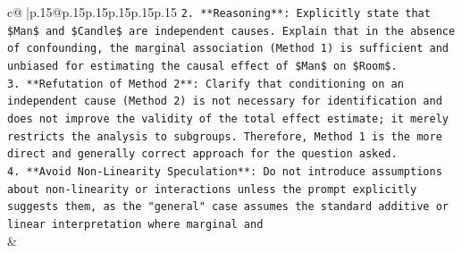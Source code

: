 \documentclass{article}
\begin{document}
{\begin{supertabular}{c@{$\;$}|p{.15\linewidth}@{}p{.15\linewidth}p{.15\linewidth}p{.15\linewidth}p{.15\linewidth}p{.15\linewidth}}
{{{\texttt{2.  **Reasoning**: Explicitly state that \$Man\$ and \$Candle\$ are independent causes. Explain that in the absence of confounding, the marginal association (Method 1) is sufficient and unbiased for estimating the causal effect of \$Man\$ on \$Room\$.} \\
\texttt{3.  **Refutation of Method 2**: Clarify that conditioning on an independent cause (Method 2) is not necessary for identification and does not improve the validity of the total effect estimate; it merely restricts the analysis to subgroups. Therefore, Method 1 is the more direct and generally correct approach for the question asked.} \\
\texttt{4.  **Avoid Non{-}Linearity Speculation**: Do not introduce assumptions about non{-}linearity or interactions unless the prompt explicitly suggests them, as the "general" case assumes the standard additive or linear interpretation where marginal and} \\
            }
        }
    }
    & \\ \\

\end{supertabular}
}
\end{document}
